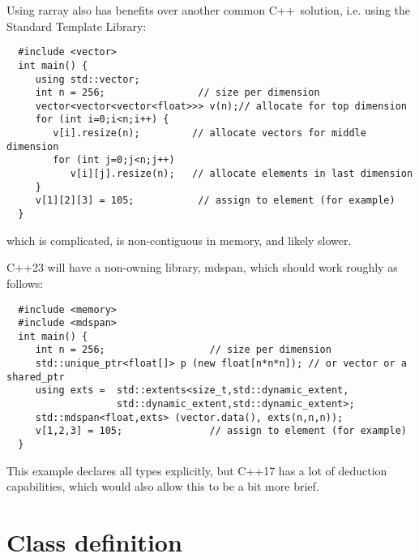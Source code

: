 \documentclass[11pt,twoside]{article}
\newcommand{\cxx}{C{++}}
\begin{document}
Using rarray also has benefits over another common \cxx\ 
solution, i.e. using the Standard Template Library:
\vspace{-5pt}\begin{framed}\vspace{-14pt}%
\begin{verbatim}
  #include <vector>
  int main() {
     using std::vector;
     int n = 256;                // size per dimension
     vector<vector<vector<float>>> v(n);// allocate for top dimension
     for (int i=0;i<n;i++) {
        v[i].resize(n);         // allocate vectors for middle dimension
        for (int j=0;j<n;j++) 
           v[i][j].resize(n);   // allocate elements in last dimension
     }
     v[1][2][3] = 105;           // assign to element (for example)
  }
\end{verbatim}%
\vspace{-14pt}\end{framed}\vspace{-8pt}
\noindent
which is complicated, is non-contiguous in memory, and likely
slower.

C++23 will have a non-owning library, mdspan, which should work
roughly as follows:
\vspace{-5pt}\begin{framed}\vspace{-14pt}%
\begin{verbatim}
  #include <memory>
  #include <mdspan>
  int main() {
     int n = 256;                  // size per dimension
     std::unique_ptr<float[]> p (new float[n*n*n]); // or vector or a shared_ptr
     using exts =  std::extents<size_t,std::dynamic_extent,
                   std::dynamic_extent,std::dynamic_extent>;
     std::mdspan<float,exts> (vector.data(), exts(n,n,n));
     v[1,2,3] = 105;               // assign to element (for example)
  }
\end{verbatim}%
\vspace{-14pt}\end{framed}\vspace{-8pt}
This example declares all types explicitly, but C++17 has a lot of
deduction capabilities, which would also allow this to be a bit more brief. 


\pagebreak[4]
\section{Class definition}
\end{document}
